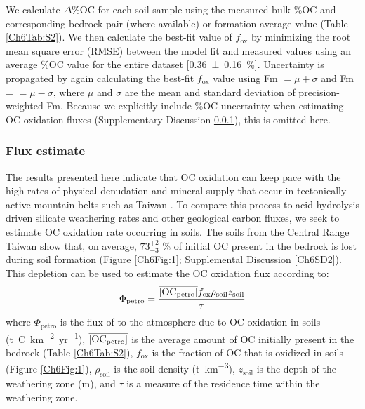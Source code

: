 We calculate $\Delta$\%OC for each soil sample using the measured bulk \%OC and corresponding bedrock pair (where available) or formation average value (Table \ref{Ch6Tab:S2}). We then calculate the best-fit value of $f_{\text{ox}}$ by minimizing the root mean square error (RMSE) between the model fit and measured values using an average \%OC value for the entire dataset [\SI{0.36 \pm 0.16}{\%}]. Uncertainty is propagated by again calculating the best-fit $f_{\text{ox}}$ value using Fm $= \mu + \sigma$ and Fm = $= \mu - \sigma$, where $\mu$ and $\sigma$ are the mean and standard deviation of precision-weighted Fm. Because we explicitly include \%OC uncertainty when estimating OC oxidation fluxes (Supplementary Discussion \ref{Ch6SD4}), this is omitted here.

\subsubsection{Flux estimate}\label{Ch6SD4}

The results presented here indicate that OC oxidation can keep pace with the high rates of physical denudation and mineral supply that occur in tectonically active mountain belts such as Taiwan \citep{Dadson:2003kl}. To compare this process to acid-hydrolysis driven silicate weathering rates and other geological carbon fluxes, we seek to estimate OC oxidation rate occurring in soils. The soils from the Central Range Taiwan show that, on average, $73^{+2}_{-3}$ \% of initial OC present in the bedrock is lost during soil formation (Figure \ref{Ch6Fig:1}; Supplemental Discussion \ref{Ch6SD2}). This depletion can be used to estimate the OC oxidation flux according to:
%
\begin{equation}\label{Ch6Eq:6}
	\Phi_{\text{petro}} = \frac{\overline{[\text{OC}_{\text{petro}}]} f_{\text{ox}} \rho_{\text{soil}} z_{\text{soil}}}{\tau}
\end{equation}
%
where $\Phi_{\text{petro}}$ is the flux of  to the atmosphere due to OC oxidation in soils (\si{t.C.km^{-2}.yr^{-1}}), $\overline{[\text{OC}_{\text{petro}}]}$ is the average amount of OC initially present in the bedrock (Table \ref{Ch6Tab:S2}), $f_{\text{ox}}$ is the fraction of OC that is oxidized in soils (Figure \ref{Ch6Fig:1}), $\rho_{\text{soil}}$ is the soil density (\si{t.km^{-3}}), $z_{\text{soil}}$ is the depth of the weathering zone (\si{m}), and $\tau$ is a measure of the residence time within the weathering zone.

